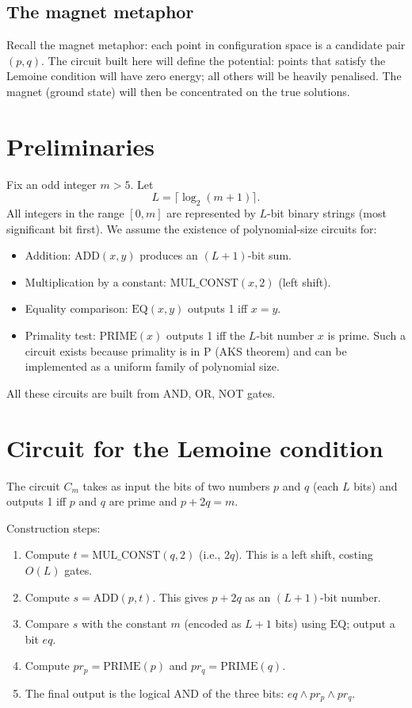 \documentclass[11pt,a4paper]{article}
\begin{document}
\subsection{The magnet metaphor}

Recall the magnet metaphor: each point in configuration space is a candidate pair \((p,q)\). The circuit built here will define the potential: points that satisfy the Lemoine condition will have zero energy; all others will be heavily penalised. The magnet (ground state) will then be concentrated on the true solutions.

\section{Preliminaries}

Fix an odd integer \(m > 5\). Let
\[
L = \lceil \log_2 (m+1)\rceil.
\]
All integers in the range \([0,m]\) are represented by \(L\)-bit binary strings (most significant bit first). We assume the existence of polynomial‑size circuits for:
\begin{itemize}
\item Addition: \(\mathrm{ADD}(x,y)\) produces an \((L+1)\)-bit sum.
\item Multiplication by a constant: \(\mathrm{MUL\_CONST}(x,2)\) (left shift).
\item Equality comparison: \(\mathrm{EQ}(x,y)\) outputs 1 iff \(x=y\).
\item Primality test: \(\mathrm{PRIME}(x)\) outputs 1 iff the \(L\)-bit number \(x\) is prime. Such a circuit exists because primality is in P (AKS theorem) and can be implemented as a uniform family of polynomial size.
\end{itemize}
All these circuits are built from AND, OR, NOT gates.

\section{Circuit for the Lemoine condition}

The circuit \(C_m\) takes as input the bits of two numbers \(p\) and \(q\) (each \(L\) bits) and outputs 1 iff \(p\) and \(q\) are prime and \(p + 2q = m\).

Construction steps:
\begin{enumerate}
\item Compute \(t = \mathrm{MUL\_CONST}(q, 2)\) (i.e., \(2q\)). This is a left shift, costing \(O(L)\) gates.
\item Compute \(s = \mathrm{ADD}(p, t)\). This gives \(p+2q\) as an \((L+1)\)-bit number.
\item Compare \(s\) with the constant \(m\) (encoded as \(L+1\) bits) using \(\mathrm{EQ}\); output a bit \(eq\).
\item Compute \(pr_p = \mathrm{PRIME}(p)\) and \(pr_q = \mathrm{PRIME}(q)\).
\item The final output is the logical AND of the three bits: \(eq \land pr_p \land pr_q\).
\end{enumerate}
\end{document}
